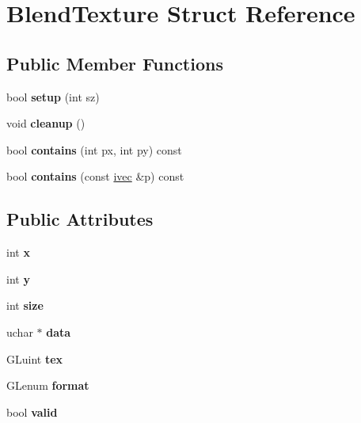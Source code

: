 \hypertarget{struct_blend_texture}{}\section{Blend\+Texture Struct Reference}
\label{struct_blend_texture}
\subsection*{Public Member Functions}
\begin{DoxyCompactItemize}
\item 
\mbox{\label{struct_blend_texture_ae09f60147b3b3257fd3f49cfb871aadd}} 
bool {\bfseries setup} (int sz)
\item 
\mbox{\label{struct_blend_texture_a090cea35ba21a821f1c2975bac15c666}} 
void {\bfseries cleanup} ()
\item 
\mbox{\label{struct_blend_texture_a86469062b9789d14377eee326dcfb0d8}} 
bool {\bfseries contains} (int px, int py) const
\item 
\mbox{\label{struct_blend_texture_a2ef925c7d30a00682487ba0d475bda60}} 
bool {\bfseries contains} (const \hyperlink{structivec}{ivec} \&p) const
\end{DoxyCompactItemize}
\subsection*{Public Attributes}
\begin{DoxyCompactItemize}
\item 
\mbox{\label{struct_blend_texture_ae1d433263240ffc9dba95c2e56821eb8}} 
int {\bfseries x}
\item 
\mbox{\label{struct_blend_texture_a206f9a7277a7f9646b5efd446a4a0f9d}} 
int {\bfseries y}
\item 
\mbox{\label{struct_blend_texture_a6042338de4bb337adf4117bc645d2960}} 
int {\bfseries size}
\item 
\mbox{\label{struct_blend_texture_af4d1b994390426b9214d04c22eb1df4f}} 
uchar $\ast$ {\bfseries data}
\item 
\mbox{\label{struct_blend_texture_acccbe6e2ffc2073fc354f9d4e61e7ee9}} 
G\+Luint {\bfseries tex}
\item 
\mbox{\label{struct_blend_texture_a149774587c5eb2fb694ebf18c91f7ec5}} 
G\+Lenum {\bfseries format}
\item 
\mbox{\label{struct_blend_texture_aaae475ca2a21620d237e9318e17b5f65}} 
bool {\bfseries valid}
\end{DoxyCompactItemize}


